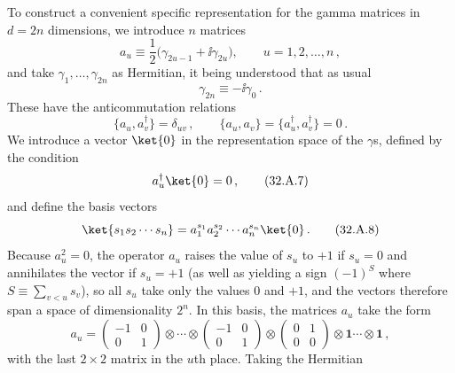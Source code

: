 To construct a convenient specific representation for the gamma matrices in
\(d=2n\) dimensions, we introduce \(n\) matrices
\begin{equation}
  a_u\equiv\frac{1}{2}\bigl(\gamma_{2u-1}+\ii\gamma_{2u}\bigr),
  \qquad u=1,2,\ldots,n\,,
  \tag{32.A.4}\label{eq:32.A.4}
\end{equation}
and take \(\gamma_1,\ldots,\gamma_{2n}\) as Hermitian, it being understood
that as usual
\begin{equation}
  \gamma_{2n}\equiv-\ii\gamma_0\,.
  \tag{32.A.5}\label{eq:32.A.5}
\end{equation}
These have the anticommutation relations
\begin{equation}
  \{a_u,a_v^\dagger\}=\delta_{uv}\,,
  \qquad
  \{a_u,a_v\}=\{a_u^\dagger,a_v^\dagger\}=0\,.
  \tag{32.A.6}\label{eq:32.A.6}
\end{equation}
We introduce a vector \(\ket{0}\) in the representation space of the
\(\gamma\)s, defined by the condition
\begin{equation}
  a_u^\dagger\ket{0}=0\,,
  \tag{32.A.7}\label{eq:32.A.7}
\end{equation}
and define the basis vectors
\begin{equation}
  \ket{s_1s_2\cdots s_n}
  =a_1^{s_1}a_2^{s_2}\cdots a_n^{s_n}\ket{0}\,.
  \tag{32.A.8}\label{eq:32.A.8}
\end{equation}
Because \(a_u^2=0\), the operator \(a_u\) raises the value of \(s_u\) to
\(+1\) if \(s_u=0\) and annihilates the vector if \(s_u=+1\) (as well as
yielding a sign \((-1)^S\) where \(S\equiv\sum_{v<u}s_v\)), so all \(s_u\)
take only the values 0 and \(+1\), and the vectors therefore span a space
of dimensionality \(2^n\). In this basis, the matrices \(a_u\) take the
form
\begin{equation}
  a_u=
  \begin{pmatrix}
    -1&0\\
    0&1
  \end{pmatrix}
  \otimes\cdots\otimes
  \begin{pmatrix}
    -1&0\\
    0&1
  \end{pmatrix}
  \otimes
  \begin{pmatrix}
    0&1\\
    0&0
  \end{pmatrix}
  \otimes\mathbf{1}\cdots\otimes\mathbf{1}\,,
  \tag{32.A.9}\label{eq:32.A.9}
\end{equation}
with the last \(2\times2\) matrix in the \(u\)th place. Taking the Hermitian
